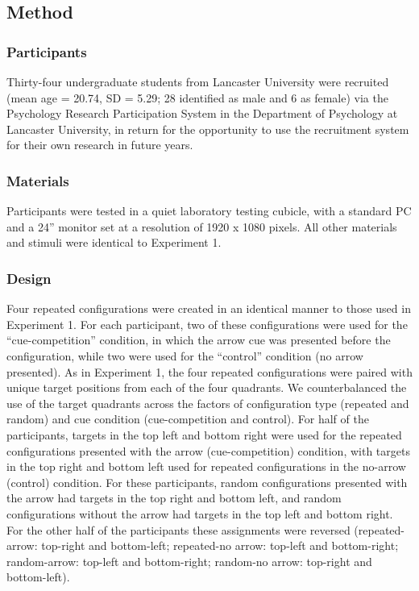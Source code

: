 \documentclass[
  man,floatsintext]{apa7}
\begin{document}
\hypertarget{method-1}{%
\subsection{Method}\label{method-1}}

\hypertarget{participants-1}{%
\subsubsection{Participants}\label{participants-1}}

Thirty-four undergraduate students from Lancaster University were recruited (mean age = 20.74, SD = 5.29; 28 identified as male and 6 as female) via the Psychology Research Participation System in the Department of Psychology at Lancaster University, in return for the opportunity to use the recruitment system for their own research in future years.

\hypertarget{materials-1}{%
\subsubsection{Materials}\label{materials-1}}

Participants were tested in a quiet laboratory testing cubicle, with a standard PC and a 24'' monitor set at a resolution of 1920 x 1080 pixels. All other materials and stimuli were identical to Experiment 1.

\hypertarget{design-1}{%
\subsubsection{Design}\label{design-1}}

Four repeated configurations were created in an identical manner to those used in Experiment 1. For each participant, two of these configurations were used for the ``cue-competition'' condition, in which the arrow cue was presented before the configuration, while two were used for the ``control'' condition (no arrow presented). As in Experiment 1, the four repeated configurations were paired with unique target positions from each of the four quadrants. We counterbalanced the use of the target quadrants across the factors of configuration type (repeated and random) and cue condition (cue-competition and control). For half of the participants, targets in the top left and bottom right were used for the repeated configurations presented with the arrow (cue-competition) condition, with targets in the top right and bottom left used for repeated configurations in the no-arrow (control) condition. For these participants, random configurations presented with the arrow had targets in the top right and bottom left, and random configurations without the arrow had targets in the top left and bottom right. For the other half of the participants these assignments were reversed (repeated-arrow: top-right and bottom-left; repeated-no arrow: top-left and bottom-right; random-arrow: top-left and bottom-right; random-no arrow: top-right and bottom-left).
\end{document}
